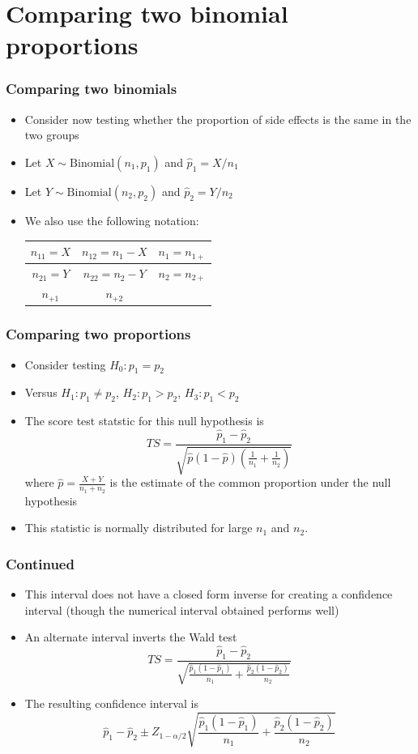 \documentclass[aspectratio=169]{beamer}
\begin{document}
\section{Comparing two binomial proportions}
\begin{frame}\frametitle{Comparing two binomials}
  \begin{itemize}
  \item Consider now testing whether the proportion of side effects is the same
    in the two groups
  \item Let $X \sim \mathrm{Binomial}(n_1, p_1)$ and $\hat p_1 = X / n_1$
  \item Let $Y \sim \mathrm{Binomial}(n_2, p_2)$ and $\hat p_2 = Y / n_2$
  \item We also use the following notation:
    \begin{center}
      \begin{tabular}{|c|c|c|}\hline
        $n_{11} = X$ & $n_{12} = n_1 - X$ & $n_1 = n_{1+}$ \\ \hline
        $n_{21} = Y$ & $n_{22} = n_2 - Y$ & $n_2 = n_{2+}$ \\ \hline
        $n_{+1}$     & $n_{+2}$           &       \\ \hline 
      \end{tabular}
    \end{center}
  \end{itemize}
\end{frame}

\begin{frame}\frametitle{Comparing two proportions}
  \begin{itemize}
  \item Consider testing $H_0:p_1 = p_2$ 
  \item Versus $H_1:p_1 \neq p_2$, $H_2:p_1>p_2$, $H_3:p_1 < p_2$ 
  \item The score test statstic for this null hypothesis is
    $$
    TS = \frac{\hat p_1 - \hat p_2}{\sqrt{\hat p (1 - \hat p)(\frac{1}{n_1} + \frac{1}{n_2})}}
    $$
    where $\hat p = \frac{X + Y}{n_1 + n_2}$ is the estimate of the
    common proportion under the null hypothesis
  \item This statistic is normally distributed for large $n_1$ and
    $n_2$.
  \end{itemize}
\end{frame}

\begin{frame}\frametitle{Continued}
  \begin{itemize}
  \item This interval does not have a closed form inverse for creating a
    confidence interval (though the numerical interval obtained performs
    well)
  \item An alternate interval inverts the Wald test
    $$
    TS = \frac{\hat p_1 - \hat p_2}{\sqrt{\frac{\hat p_1 (1 - \hat p_1)}{n_1} + \frac{\hat p_2(1 - \hat p_2)}{n_2}}}
    $$
  \item The resulting confidence interval is
    $$
    \hat p_1 - \hat p_2 \pm Z_{1-\alpha / 2}\sqrt{\frac{\hat p_1 (1 - \hat p_1)}{n_1} + \frac{\hat p_2(1 - \hat p_2)}{n_2}}
    $$
    \end{itemize}
  \end{frame}
\end{document}
